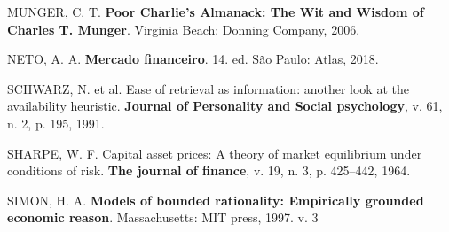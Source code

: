 \documentclass[grad,numbers]{coppe}
\newenvironment{cslreferences}%
  {}%
  {\par}
\begin{document}
\begin{cslreferences}
  \leavevmode\hypertarget{ref-munger2006}{}%
  MUNGER, C. T. \textbf{Poor Charlie's Almanack: The Wit and Wisdom of Charles T. Munger}. Virginia Beach: Donning Company, 2006.

  \leavevmode\hypertarget{ref-assafneto2018}{}%
  NETO, A. A. \textbf{Mercado financeiro}. 14. ed. São Paulo: Atlas, 2018.

  \leavevmode\hypertarget{ref-schwarz1991}{}%
  SCHWARZ, N. et al. Ease of retrieval as information: another look at the availability heuristic. \textbf{Journal of Personality and Social psychology}, v. 61, n. 2, p. 195, 1991.

  \leavevmode\hypertarget{ref-sharpe1964}{}%
  SHARPE, W. F. Capital asset prices: A theory of market equilibrium under conditions of risk. \textbf{The journal of finance}, v. 19, n. 3, p. 425--442, 1964.

  \leavevmode\hypertarget{ref-simon1997}{}%
  SIMON, H. A. \textbf{Models of bounded rationality: Empirically grounded economic reason}. Massachusetts: MIT press, 1997. v. 3
  \end{cslreferences}
  \backmatter
  
  

\end{document}
